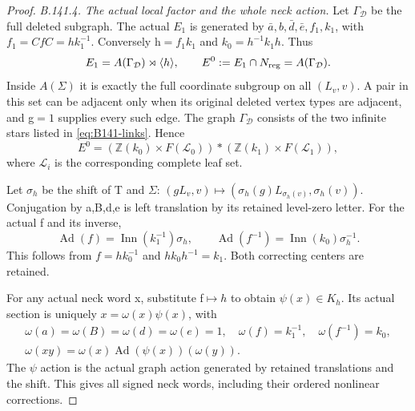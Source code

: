 \begin{proof}
\emph{B.141.4. The actual local factor and the whole neck action.}
Let $\Gamma_{\mathcal D}$ be the full deleted subgraph.
The actual $E_1$ is generated by
$\bar a,b,\bar d,\bar e,f_1,k_1$, with
$f_1=CfC=hk_1^{-1}$. Conversely h$=f_1k_1$ and
$k_0=h^{-1}k_1h$. Thus
\[
E_1=A(\Gamma_{\mathcal D})\rtimes\langle h\rangle,
\qquad E^0:=E_1\cap N_{\rm reg}=A(\Gamma_{\mathcal D}).
\]
Inside $A(\Sigma)$ it is exactly the full coordinate subgroup on
all $(L_v,v)$. A pair in this set can be adjacent only when its
original deleted vertex types are adjacent, and g$=1$ supplies
every such edge. The graph $\Gamma_{\mathcal D}$ consists of the
two infinite stars listed in \eqref{eq:B141-links}. Hence
\[
E^0=(\mathbb Z(k_0)\times F(\mathcal L_0))*
       (\mathbb Z(k_1)\times F(\mathcal L_1)),
\]
where $\mathcal L_i$ is the corresponding complete leaf set.

Let $\sigma_h$ be the shift of T and $\Sigma$:
$(gL_v,v)\mapsto(\sigma_h(g)L_{\sigma_h(v)},\sigma_h(v))$.
Conjugation by a,B,d,e is left translation by its retained
level-zero letter. For the actual f and its inverse,
\begin{equation}\label{eq:B141-branch-action}
\operatorname{Ad}(f)
=\operatorname{Inn}(k_1^{-1})\sigma_h,
\qquad
\operatorname{Ad}(f^{-1})
=\operatorname{Inn}(k_0)\sigma_h^{-1}.
\end{equation}
This follows from $f=hk_0^{-1}$ and $hk_0h^{-1}=k_1$.
Both correcting centers are retained.

For any actual neck word x, substitute f$\mapsto h$ to obtain
$\psi(x)\in K_h$. Its actual section is uniquely
$x=\omega(x)\psi(x)$, with
\begin{equation}\label{eq:B141-cocycle}
\begin{gathered}
\omega(a)=\omega(B)=\omega(d)=\omega(e)=1,\quad
\omega(f)=k_1^{-1},\quad\omega(f^{-1})=k_0,\\
\omega(xy)=\omega(x)\operatorname{Ad}(\psi(x))(\omega(y)).
\end{gathered}
\end{equation}
The $\psi$ action is the actual graph action generated by retained
translations and the shift. This gives all signed neck words,
including their ordered nonlinear corrections.


\end{proof}
